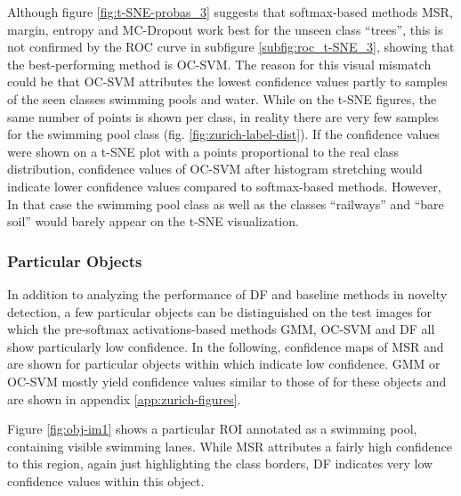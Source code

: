 \documentclass[10pt]{article}
\begin{document}
\restoregeometry

Although figure \ref{fig:t-SNE-probas_3} suggests that softmax-based methods \gls{MSR}, margin, entropy and \gls{MC-Dropout} work best for the unseen class ``trees'', this is not confirmed by the \gls{ROC} curve in subfigure  \ref{subfig:roc_t-SNE_3}, showing that the best-performing method is \gls{OC-SVM}. The reason for this visual mismatch could be that \gls{OC-SVM} attributes the lowest confidence values partly to samples of the seen classes swimming pools and water. While on the \gls{t-SNE} figures, the same number of points is shown per class, in reality there are very few samples for the swimming pool class (fig. \ref{fig:zurich-label-dist}). If the confidence values were shown on a t-SNE plot with a points proportional to the real class distribution, confidence values of \gls{OC-SVM} after histogram stretching would indicate lower confidence values compared to softmax-based methods. However, In that case the swimming pool class as well as the classes ``railways'' and ``bare soil'' would barely appear on the \gls{t-SNE} visualization. 

\subsubsection{Particular Objects}
\label{subsubsec:objects}
In addition to analyzing the performance of \acrlong{DF} and baseline methods in novelty detection, a few particular objects can be distinguished on the test images for which the pre-softmax activations-based methods \gls{GMM}, \gls{OC-SVM} and \acrlong{DF} all show particularly low confidence. In the following, confidence maps of \gls{MSR} and  are shown for particular objects within which  indicate low confidence. \gls{GMM} or \gls{OC-SVM} mostly yield confidence values similar to those of  for these objects and are shown in appendix \ref{app:zurich-figures}.

Figure \ref{fig:obj-im1} shows a particular \gls{ROI} annotated as a swimming pool, containing visible swimming lanes. While \gls{MSR} attributes a fairly high confidence to this region, again just highlighting the class borders, \gls{DF} indicates very low confidence values within this object.
\end{document}
